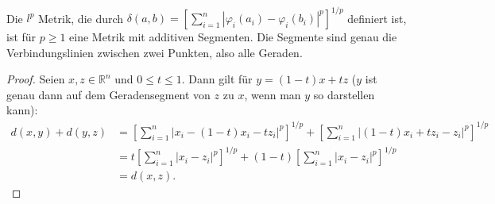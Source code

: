 \begin{ex}~\\
  Die $l^p$ Metrik, die durch $\delta(a, b) = \left[\sum_{i=1}^{n} |\varphi_i(a_i) - \varphi_i(b_i)|^p\right]^{1/p}$ definiert ist, ist für $p \geq 1$ eine Metrik mit additiven Segmenten. Die Segmente sind genau die Verbindungslinien zwischen zwei Punkten, also alle Geraden.

  \begin{proof}
  Seien $x, z \in \mathbb{R}^{n}$ und $0 \leq t \leq 1$. Dann gilt für $y = (1-t) x + t z$ ($y$ ist genau dann auf dem Geradensegment von $z$ zu $x$, wenn man $y$ so darstellen kann):
\begin{align*}
d(x, y) + d(y, z) &= \left[ \sum_{i=1}^{n} \left| x_i - (1 - t) x_i - t z_i \right|^p \right]^{1/p} + \left[ \sum_{i=1}^{n} \left| (1 - t) x_i + t z_i - z_i \right|^p \right]^{1/p} \\
&= t \left[ \sum_{i=1}^{n} \left| x_i - z_i \right|^p \right]^{1/p} + (1 - t) \left[ \sum_{i=1}^{n} \left| x_i - z_i \right|^p \right]^{1/p} \\
&= d(x, z).
\end{align*}
  \end{proof}
\end{ex}

